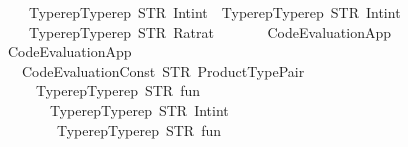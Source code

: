 \begin{isabellebody}
\ \ \ \ \ \ \ \ \ \ \ {\isacharbrackleft}{\kern0pt}Typerep{\isachardot}{\kern0pt}Typerep\ {\isacharparenleft}{\kern0pt}STR\ {\isacharprime}{\kern0pt}{\isacharprime}{\kern0pt}Int{\isachardot}{\kern0pt}int{\isacharprime}{\kern0pt}{\isacharprime}{\kern0pt}{\isacharparenright}{\kern0pt}\ {\isacharbrackleft}{\kern0pt}{\isacharbrackright}{\kern0pt}{\isacharcomma}{\kern0pt}\ Typerep{\isachardot}{\kern0pt}Typerep\ {\isacharparenleft}{\kern0pt}STR\ {\isacharprime}{\kern0pt}{\isacharprime}{\kern0pt}Int{\isachardot}{\kern0pt}int{\isacharprime}{\kern0pt}{\isacharprime}{\kern0pt}{\isacharparenright}{\kern0pt}\ {\isacharbrackleft}{\kern0pt}{\isacharbrackright}{\kern0pt}{\isacharbrackright}{\kern0pt}{\isacharcomma}{\kern0pt}\isanewline
\ \ \ \ \ \ \ \ \ \ \ Typerep{\isachardot}{\kern0pt}Typerep\ {\isacharparenleft}{\kern0pt}STR\ {\isacharprime}{\kern0pt}{\isacharprime}{\kern0pt}Rat{\isachardot}{\kern0pt}rat{\isacharprime}{\kern0pt}{\isacharprime}{\kern0pt}{\isacharparenright}{\kern0pt}\ {\isacharbrackleft}{\kern0pt}{\isacharbrackright}{\kern0pt}{\isacharbrackright}{\kern0pt}{\isacharparenright}{\kern0pt}{\isacharparenright}{\kern0pt}\isanewline
\ \ \ \ \ \ {\isacharparenleft}{\kern0pt}Code{\isacharunderscore}{\kern0pt}Evaluation{\isachardot}{\kern0pt}App\isanewline
\ \ \ \ \ \ \ \ {\isacharparenleft}{\kern0pt}Code{\isacharunderscore}{\kern0pt}Evaluation{\isachardot}{\kern0pt}App\isanewline
\ \ \ \ \ \ \ \ \ \ {\isacharparenleft}{\kern0pt}Code{\isacharunderscore}{\kern0pt}Evaluation{\isachardot}{\kern0pt}Const\ {\isacharparenleft}{\kern0pt}STR\ {\isacharprime}{\kern0pt}{\isacharprime}{\kern0pt}Product{\isacharunderscore}{\kern0pt}Type{\isachardot}{\kern0pt}Pair{\isacharprime}{\kern0pt}{\isacharprime}{\kern0pt}{\isacharparenright}{\kern0pt}\isanewline
\ \ \ \ \ \ \ \ \ \ \ \ {\isacharparenleft}{\kern0pt}Typerep{\isachardot}{\kern0pt}Typerep\ {\isacharparenleft}{\kern0pt}STR\ {\isacharprime}{\kern0pt}{\isacharprime}{\kern0pt}fun{\isacharprime}{\kern0pt}{\isacharprime}{\kern0pt}{\isacharparenright}{\kern0pt}\isanewline
\ \ \ \ \ \ \ \ \ \ \ \ \ \ {\isacharbrackleft}{\kern0pt}Typerep{\isachardot}{\kern0pt}Typerep\ {\isacharparenleft}{\kern0pt}STR\ {\isacharprime}{\kern0pt}{\isacharprime}{\kern0pt}Int{\isachardot}{\kern0pt}int{\isacharprime}{\kern0pt}{\isacharprime}{\kern0pt}{\isacharparenright}{\kern0pt}\ {\isacharbrackleft}{\kern0pt}{\isacharbrackright}{\kern0pt}{\isacharcomma}{\kern0pt}\isanewline
\ \ \ \ \ \ \ \ \ \ \ \ \ \ \ Typerep{\isachardot}{\kern0pt}Typerep\ {\isacharparenleft}{\kern0pt}STR\ {\isacharprime}{\kern0pt}{\isacharprime}{\kern0pt}fun{\isacharprime}{\kern0pt}{\isacharprime}{\kern0pt}{\isacharparenright}{\kern0pt}\isanewline

\end{isabellebody}
